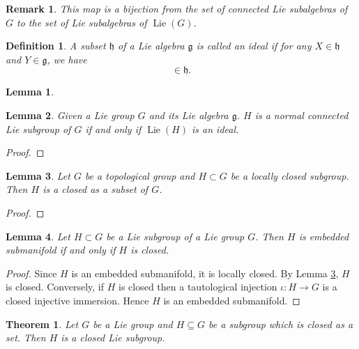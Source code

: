 \documentclass{article}
\newtheorem{theorem}{Theorem}[section]
\newtheorem{definition}{Definition}[section]
\newtheorem{lemma}{Lemma}[section]
\newtheorem{remark}{Remark}[section]
\numberwithin{equation}{section}
\DeclareMathOperator{\Lie}{Lie}
\begin{document}
\begin{remark}
This map is a bijection from the set of connected Lie subalgebras of $G$ to the set of Lie subalgebras of $\Lie(G)$. 
\end{remark}

\begin{definition}
A subset $\mathfrak{h}$ of a Lie algebra $\mathfrak{g}$ is called an ideal if for any $X\in \mathfrak{h}$ and $Y\in\mathfrak{g}$, we have
\begin{equation*}
[X|Y]\in\mathfrak{h}.
\end{equation*}
\end{definition}

\begin{lemma}
\end{lemma}

\begin{lemma}
Given a Lie group $G$ and its Lie algebra $\mathfrak{g}$. $H$ is a normal connected Lie subgroup of $G$ if and only if $\Lie(H)$ is an ideal. 
\end{lemma}

\begin{proof}
\end{proof}

\begin{lemma}
Let $G$ be a topological group and $H\subset G$ be a locally closed subgroup. Then $H$ is a closed as a subset of $G$.
\label{locally_closed_subgroup}
\end{lemma}

\begin{proof}
\end{proof}

\begin{lemma}
Let $H\subset G$ be a Lie subgroup of a Lie group $G$. Then $H$ is embedded submanifold if and only if $H$ is closed.
\end{lemma}
\begin{proof}
Since $H$ is an embedded submanifold, it is locally closed. %
By Lemma \ref{locally_closed_subgroup}, $H$ is closed. Conversely, if $H$ is closed then a tautological injection $\iota:H\to G$ is a closed injective immersion. Hence $H$ is an embedded submanifold. %
\end{proof}

\begin{theorem}
Let $G$ be a Lie group and $H\subseteq G$ be a subgroup which is closed as a set. Then $H$ is a closed Lie subgroup.
\label{closed_subgroup}
\end{theorem}
\end{document}
